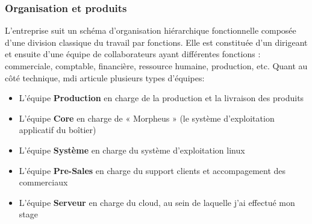         \subsubsection{Organisation et produits}
        L’entreprise suit un schéma d’organisation hiérarchique fonctionnelle composée d’une division classique du 
        travail par fonctions. Elle est constituée d’un dirigeant et ensuite d’une équipe de collaborateurs ayant 
        différentes fonctions : commerciale, comptable, financière, ressource humaine, production, etc. 
           Quant au côté technique, \gls{mdi} articule plusieurs types d'équipes: \\
            \begin{itemize}
                \renewcommand{\labelitemi}{$\bullet$}
                \item L’équipe \textbf{Production} en charge de la production et la livraison des produits
                \item L’équipe \textbf{Core} en charge de « Morpheus » (le système d’exploitation applicatif du boîtier)
                \item L’équipe \textbf{Système} en charge du système d'exploitation linux
                \item L’équipe \textbf{Pre-Sales} en charge du support clients et accompagement des commerciaux
                \item L’équipe \textbf{Serveur} en charge du cloud, au sein de laquelle j'ai effectué mon stage
            \end{itemize} 
            
            \vspace{0.5cm}

